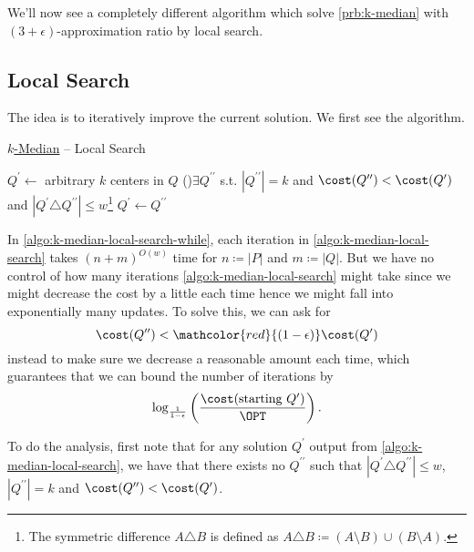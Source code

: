 We'll now see a completely different algorithm which solve \autoref{prb:k-median} with \((3 + \epsilon )\)-approximation ratio by local search.
\subsection{Local Search}
The idea is to iteratively improve the current solution. We first see the algorithm.

\begin{algorithm}[H]\label{algo:k-median-local-search}
	\DontPrintSemicolon
	\caption{\hyperref[prb:k-median]{\(k\)-Median} -- Local Search}
	\BlankLine

	\(Q^\prime \gets \) arbitrary \(k\) centers in \(Q\)\;
	\While(\label{algo:k-median-local-search-while}){\(\exists Q^{\prime\prime}\) s.t. \(\left\vert Q^{\prime\prime} \right\vert = k \) and \(\cost(Q^{\prime\prime}) < \cost(Q^\prime )\) and \(\left\vert Q^\prime \triangle Q^{\prime\prime} \right\vert \leq w\)\footnote{The symmetric difference \(A \triangle B\) is defined as \(A \triangle B \coloneqq (A \setminus B) \cup (B\setminus A)\).}}{
		\(Q^\prime \gets Q^{\prime\prime}\)\;
	}
	\;
\end{algorithm}

\begin{remark}[Runtime]
	In \autoref{algo:k-median-local-search-while}, each iteration in \autoref{algo:k-median-local-search} takes \((n+m)^{O(w)}\) time for \(n \coloneqq \left\vert P \right\vert \) and \(m \coloneqq \left\vert Q \right\vert \). But we have no control of how many iterations \autoref{algo:k-median-local-search} might take since we might decrease the cost by a little each time hence we might fall into exponentially many updates. To solve this, we can ask for
	\[
		\cost(Q^{\prime\prime}) < \mathcolor{red}{(1 - \epsilon )}\cost(Q^\prime )
	\]
	instead to make sure we decrease a reasonable amount each time, which guarantees that we can bound the number of iterations by
	\[
		\log_\frac{1}{1-\epsilon } \left( \frac{\cost(\text{starting } Q^\prime )}{\OPT} \right).
	\]
\end{remark}

To do the analysis, first note that for any solution \(Q^\prime \) output from \autoref{algo:k-median-local-search}, we have that there exists no \(Q^{\prime\prime}\) such that \(\left\vert Q^\prime \triangle Q^{\prime\prime} \right\vert \leq w\), \(\left\vert Q^{\prime\prime} \right\vert = k\) and \(\cost(Q^{\prime\prime}) < \cost(Q^\prime )\).


